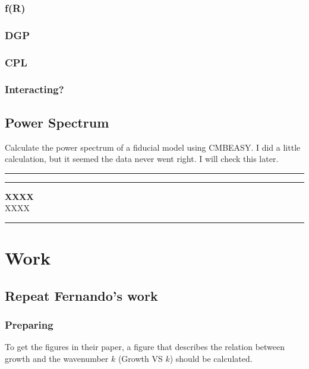 \documentclass{article}
\begin{document}
\subsubsection{f(R)}
\subsubsection{DGP}
\subsubsection{CPL}
\subsubsection{Interacting?}




\subsection{Power Spectrum}

Calculate the power spectrum of a fiducial model using CMBEASY. {\color{red}I did a little calculation, but it seemed the data never went right. I will check this later.}







\newpage    %
\hrule\vspace{1pt}\hrule
\begin{center}
\mbox{{\bf XXXX}} \\
\vspace{0.5em}
\mbox{{XXXX}}
\end{center}
\hrule



\section{Work}

\subsection{Repeat Fernando's work}

\subsubsection{Preparing}

To get the figures in their paper, a figure that describes the relation between growth and the wavenumber $k$ (Growth VS $k$) should be calculated.
\end{document}
